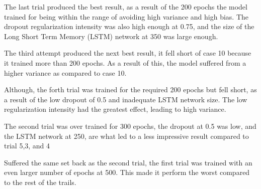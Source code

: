 \documentclass[a4paper,11pt,oneside]{book}
\begin{document}
The last trial produced the best result, as a result of the 200 epochs the model trained for being within the range
of avoiding high variance and high bias. The dropout regularization intensity was also high enough at 0.75,
and the size of the Long Short Term Memory (LSTM) network at 350 was large enough.\newline

The third attempt produced the next best result, it fell short of case 10 because it trained more than 200 epochs. As a
result of this, the model suffered from a higher variance as compared to case 10.\newline

Although, the forth trial was trained for the required 200 epochs but fell short, as a result of the low dropout of 0.5 and inadequate
LSTM network size. The low regularization intensity had the greatest effect, leading to high variance.\newline

The second trial was over trained for 300 epochs, the dropout at 0.5 was low, and the LSTM network at 250, are what
led to a less impressive result compared to trial 5,3, and 4 \newline

Suffered the same set back as the second trial, the first trial was trained with an even larger number of epochs at 500. This made it
perform the worst compared to the rest of the trails.



\end{document}
